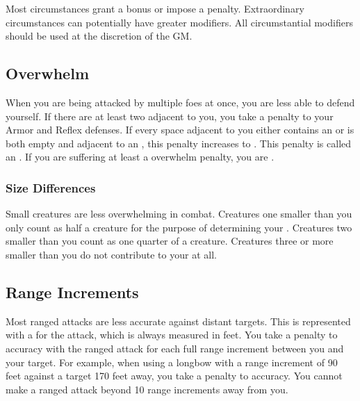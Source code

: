         Most circumstances grant a  bonus or impose a  penalty.
        Extraordinary circumstances can potentially have greater modifiers.
        All circumstantial modifiers should be used at the discretion of the GM.\@

    \subsection{Overwhelm}\label{Overwhelm}
        When you are being attacked by multiple foes at once, you are less able to defend yourself.
        If there are at least two  adjacent to you, you take a  penalty to your Armor and Reflex defenses.
        If every space adjacent to you either contains an  or is both empty and adjacent to an , this penalty increases to .
        This penalty is called an .
        If you are suffering at least a  overwhelm penalty, you are .

        \subsubsection{Size Differences}
            Small creatures are less overwhelming in combat.
            Creatures one  smaller than you only count as half a creature for the purpose of determining your .
            Creatures two  smaller than you count as one quarter of a creature.
            Creatures three or more  smaller than you do not contribute to your  at all.

    \subsection{Range Increments}\label{Range Increments}
        Most  ranged attacks are less accurate against distant targets.
        This is represented with a  for the attack, which is always measured in feet.
        You take a  penalty to accuracy with the ranged attack for each full range increment between you and your target.
        For example, when using a longbow with a range increment of 90 feet against a target 170 feet away, you take a  penalty to accuracy.
        You cannot make a ranged attack beyond 10 range increments away from you.


